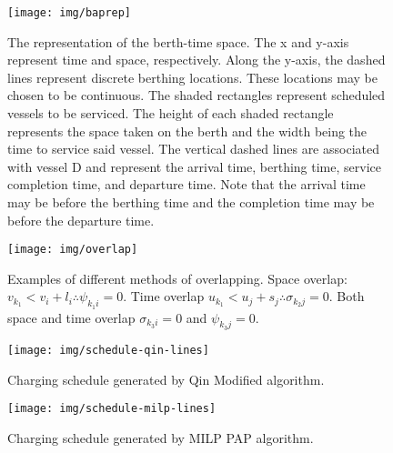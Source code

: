 \documentclass[utf8]{FrontiersinHarvard}
\begin{document}
\begin{figure}[ht]
\centering
    \texttt{[image: img/baprep]}
    \caption{The representation of the berth-time space. The x and y-axis represent time and space, respectively. Along
      the y-axis, the dashed lines represent discrete berthing locations. These locations may be chosen to be
      continuous. The shaded rectangles represent scheduled vessels to be serviced. The height of each shaded rectangle
      represents the space taken on the berth and the width being the time to service said vessel. The vertical dashed
      lines are associated with vessel D and represent the arrival time, berthing time, service completion time, and
      departure time. Note that the arrival time may be before the berthing time and the completion time may be before
      the departure time.}
    \label{fig:bap}
\end{figure}

\begin{figure}[htpb]
\centering
    \texttt{[image: img/overlap]}
    \caption{Examples of different methods of overlapping. Space overlap: $v_{k_1} < v_{i} + l_i \therefore \psi_{k_{1}i} = 0$.
             Time overlap $u_{k_1} < u_{j} + s_j \therefore \sigma_{k_{2}j} = 0$. Both space and time overlap $\sigma_{k_{3}i} = 0$ and
             $\psi_{k_{3}j} = 0$.}
    \label{fig:multipleassign}
\end{figure}

\begin{subfigures}
    \begin{figure}[htpb]
    \centering
    \texttt{[image: img/schedule-qin-lines]}
        \caption{Charging schedule generated by Qin Modified algorithm.}
        \label{subfig:qin-schedule}
    \end{figure}

    \hfill

    \begin{figure}[htpb]
    \centering
        \texttt{[image: img/schedule-milp-lines]}
        \caption{Charging schedule generated by MILP PAP algorithm.}
        \label{subfig:milp-schedule}
    \end{figure}
\end{subfigures}
\end{document}
